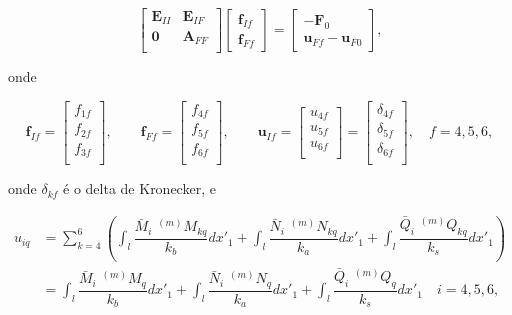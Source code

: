 \begin{equation}
	\begin{bmatrix}
		\mathbf{E}_{II} & \mathbf{E}_{IF} \\
		\mathbf{0}      & \mathbf{A}_{FF} \\
	\end{bmatrix}
	\begin{bmatrix}
		\mathbf{f}_{If} \\
		\mathbf{f}_{Ff}
	\end{bmatrix}
	=
	\begin{bmatrix}
		-\mathbf{F}_0 \\
		\mathbf{u}_{Ff} - \mathbf{u}_{F0}
	\end{bmatrix},
	\label{eq:caso2-Aff}
\end{equation}

onde

\begin{equation}
	\mathbf{f}_{If} =
	\begin{bmatrix}
		f_{1f} \\
		f_{2f} \\
		f_{3f} \\
	\end{bmatrix}, \qquad
	\mathbf{f}_{Ff} =
	\begin{bmatrix}
		f_{4f} \\
		f_{5f} \\
		f_{6f} \\
	\end{bmatrix}, \qquad
	\mathbf{u}_{If} =
	\begin{bmatrix}
		u_{4f} \\
		u_{5f} \\
		u_{6f} \\
	\end{bmatrix} =
	\begin{bmatrix}
		\delta_{4f} \\
		\delta_{5f} \\
		\delta_{6f} \\
	\end{bmatrix}, \quad
	f=4,5,6,
\end{equation}

onde $\delta_{kf}$ é o delta de Kronecker, e

\begin{align}
	u_{iq}
	 & = \sum_{k=4}^6 \left(
	\int_l \dfrac{\bar{M}_i\,\, ^{(m)}M_{kq}}{k_b} dx'_1 +
	\int_l \dfrac{\bar{N}_i\,\, ^{(m)}N_{kq}}{k_a} dx'_1 +
	\int_l \dfrac{\bar{Q}_i\,\, ^{(m)}Q_{kq}}{k_s} dx'_1 \right)                                                                                                               \\
	 & = \int_l \dfrac{\bar{M}_i\,\, ^{(m)}M_{q}}{k_b} dx'_1 + \int_l \dfrac{\bar{N}_i\,\, ^{(m)}N_{q}}{k_a} dx'_1 + \int_l \dfrac{\bar{Q}_i\,\, ^{(m)}Q_{q}}{k_s} dx'_1 \quad
	i=4,5,6,
\end{align}

